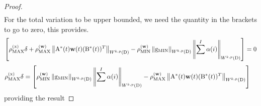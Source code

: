 \begin{proof}
\begin{align*}
\end{align*}
For the total variation to be upper bounded, we need the quantity in the brackets to go to zero, this provides.
\begin{align*}
\left[\sing \delta +  \singw \norm{\mathrm{A}^*(t)\weight(t)( \mathrm{B}^*(t))^T} - \singmin \norm{\mathrm{g}_{\mathrm{MIN} }} \norm{\sum^{I} \alpha(i) } \right] = 0 \\
\end{align*}
\begin{align*}
   \sing \delta &= \left[ \singmin \norm{\mathrm{g}_{\mathrm{MIN} }}  \norm{\sum^{I} \alpha(i) } - \singw \norm{\mathrm{A}^*(t)\weight(t)( \mathrm{B}^*(t))^T} \right]
\end{align*}
providing the result
\end{proof}


